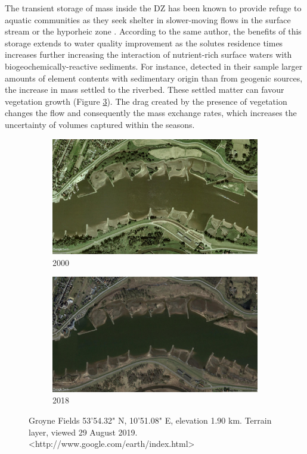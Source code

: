 The transient storage of mass inside the DZ has been known to provide refuge to aquatic communities as they seek shelter in slower-moving flows in the surface stream or the hyporheic zone \cite{jackson2013}. According to the same author, the benefits of this storage extends to water quality improvement as the solutes residence times increases further increasing the interaction of nutrient-rich surface waters with biogeochemically-reactive sediments. For instance, \textcite{SchwartzKozerski2003} detected in their sample larger amounts of element contents with sedimentary origin than from geogenic sources, the increase in mass settled to the riverbed. These settled matter can favour vegetation growth (Figure \ref{fig:satelliteImage}). The drag created by the presence of vegetation changes the flow and consequently the mass exchange rates, which increases the uncertainty of volumes captured within the seasons.

\begin{figure}[!ht]
\centering
\begin{subfigure}{0.49\textwidth}
  \centering
  \includegraphics[width=0.9\linewidth]{../images/introduction/sat2000.jpg}
  \caption{2000}
  \label{fig:sat2000}
\end{subfigure}%
\begin{subfigure}{.49\textwidth}
  \centering
  \includegraphics[width=0.9\linewidth]{../images/introduction/sat2018.jpg}
  \caption{2018}
  \label{fig:sat2018}
\end{subfigure}
\caption{Groyne Fields 53'54.32" N,  10'51.08" E, elevation 1.90 km. Terrain layer, viewed 29 August 2019. <http://www.google.com/earth/index.html>}
\label{fig:satelliteImage}
\end{figure}
